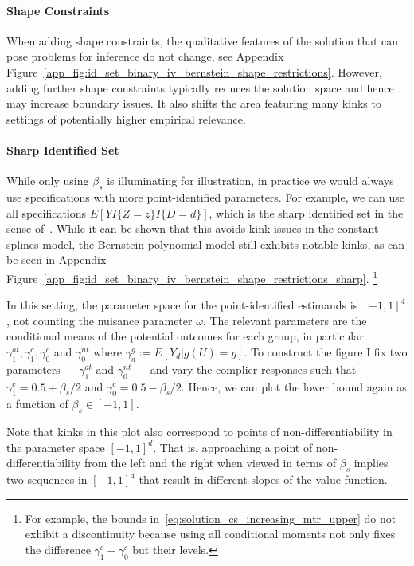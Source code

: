 \documentclass[12pt,a4paper,english]{article} %
\numberwithin{equation}{section}
\theoremstyle{definition}
\theoremstyle{remark}
\theoremstyle{plain}
\begin{document}
\paragraph{Shape Constraints}
When adding shape constraints, the qualitative features of the solution that can pose problems for inference do not change, see Appendix Figure~\ref{app_fig:id_set_binary_iv_bernstein_shape_restrictions}.
However, adding further shape constraints typically reduces the solution space and hence may increase boundary issues.
It also shifts the area featuring many kinks to settings of potentially higher empirical relevance.

\paragraph{Sharp Identified Set}
While only using $\beta_s$ is illuminating for illustration, in practice we would always use specifications with more point-identified parameters.
For example, we can use all specifications $E[YI\{Z=z\}I\{D=d\}]$, which is the sharp identified set in the sense of~\cite{mogstad2018using}.
While it can be shown that this avoids kink issues in the constant splines model, the Bernstein polynomial model still exhibits notable kinks, as can be seen in Appendix Figure~\ref{app_fig:id_set_binary_iv_bernstein_shape_restrictions_sharp}.
\footnote{For example, the bounds in~\ref{eq:solution_cs_increasing_mtr_upper} do not exhibit a discontinuity because using all conditional moments not only fixes the difference $\gamma_1^c - \gamma_0^c$ but their levels.}

In this setting, the parameter space for the point-identified estimands is $[-1,1]^4$, not counting the nuisance parameter $\omega$.
The relevant parameters are the conditional means of the potential outcomes for each group, in particular $\gamma_1^{at}, \gamma_1^c, \gamma_0^c$ and $\gamma_0^{nt}$ where $\gamma_d^g := E[Y_d|g(U) = g]$.
To construct the figure I fix two parameters --- $\gamma_1^{at}$ and $\gamma_0^{nt}$ --- and vary the complier responses such that
$\gamma_1^c = 0.5 + \beta_s/2$ and $\gamma_0^c = 0.5 - \beta_s/2$. Hence, we can plot the lower bound again as a function of $\beta_s \in [-1,1]$.

Note that kinks in this plot also correspond to points of non-differentiability in the parameter space $[-1,1]^d$.
That is, approaching a point of non-differentiability from the left and the right when viewed in terms of $\beta_s$ implies two sequences in $[-1, 1]^4$ that result in different slopes of the value function.
\end{document}
